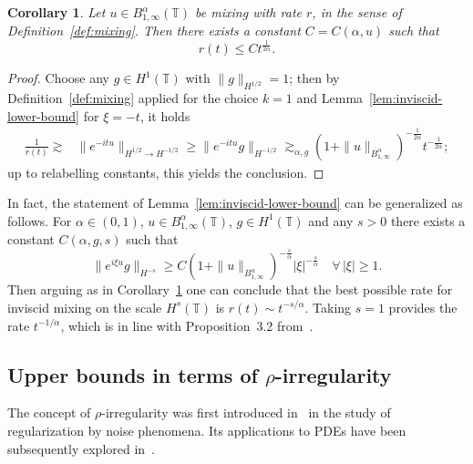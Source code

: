 \documentclass[11pt,oneside,reqno]{amsart}
\newtheorem{corollary}[theorem]{Corollary}
\numberwithin{equation}{section}
\begin{document}
\begin{corollary}
  \label{cor:inviscid-lower-bound}Let $u \in B^{\alpha}_{1, \infty}
  (\mathbb{T})$ be mixing with rate $r$, in the sense of
  Definition~\ref{def:mixing}. Then there exists a constant $C = C (\alpha,
  u)$ such that
  \[ r (t) \leqslant C t^{\frac{1}{2 \alpha}} . \]
\end{corollary}

\begin{proof}
  Choose any $g \in H^1 (\mathbb{T})$ with $\| g \|_{H^{1 / 2}} = 1$; then by
  Definition~\ref{def:mixing} applied for the choice $k = 1$ and
  Lemma~\ref{lem:inviscid-lower-bound} for $\xi = - t$, it holds
%  
  \begin{align*}
    \frac{1}{r (t)} \gtrsim & \| e^{- i t u} \|_{H^{1 / 2} \rightarrow H^{- 1
    / 2}} \geqslant \| e^{- i t u} g \|_{H^{- 1 / 2}} \gtrsim_{\alpha, g} (1 +
    \| u \|_{B^{\alpha}_{1, \infty}})^{- \frac{1}{2 \alpha}} t^{- \frac{1}{2
    \alpha}} ;
  \end{align*}
%  
  up to relabelling constants, this yields the conclusion.
\end{proof}

\begin{remark}
  \label{rem:inviscid-lower-bound}In fact, the statement of
  Lemma~\ref{lem:inviscid-lower-bound} can be generalized as follows. For
  $\alpha \in (0, 1)$, $u \in B^{\alpha}_{1, \infty} (\mathbb{T})$, $g \in H^1
  (\mathbb{T})$ and any $s > 0$ there exists a constant $C (\alpha, g, s)$
  such that
  \[ \| e^{i \xi u} g \|_{H^{- s}} \geqslant C (1 + \| u \|_{B^{\alpha}_{1,
     \infty}})^{- \frac{s}{\alpha}}  | \xi |^{- \frac{s}{\alpha}} \quad
     \forall \, | \xi | \geqslant 1. \]
  Then arguing as in Corollary~\ref{cor:inviscid-lower-bound} one can conclude
  that the best possible rate for inviscid mixing on the scale $H^s
  (\mathbb{T})$ is $r (t) \sim t^{- s / \alpha}$. Taking $s = 1$ provides the
  rate $t^{- 1 / \alpha}$, which is in line with Proposition~3.2
  from~{\cite{colombozelati}}.
\end{remark}

\subsection{Upper bounds in terms of
$\rho$-irregularity}\label{sec:upper-bound-inviscid}

The concept of $\rho$-irregularity was first introduced
in~{\cite{catellier2016averaging}} in the study of regularization by noise
phenomena. Its applications to PDEs have been subsequently explored
in~{\cite{choukgubinelli1,choukgubinelli2,galeati2020prevalence,catellier2016rough}}.
\end{document}
